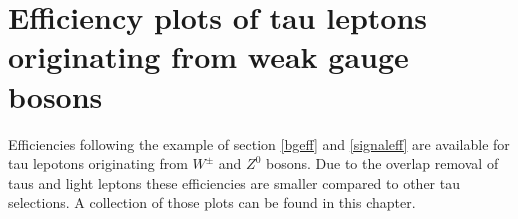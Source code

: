\section{Efficiency plots of tau leptons originating from weak gauge bosons}\label{promptplots}
Efficiencies following the example of section \ref{bgeff} and \ref{signaleff} are available for tau lepotons originating from $W^\pm$ and $Z^0$ bosons. Due to the overlap removal of taus and light leptons these efficiencies are smaller compared to other tau selections. A collection of those plots can be found in this chapter.

\listoffigures
{}%
\listoftables
{}%
